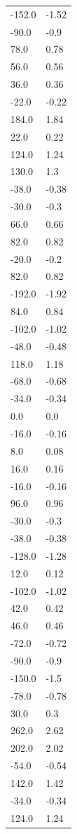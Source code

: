 \begin{longtable}{ll}
-152.0 & -1.52 \\
-90.0 & -0.9 \\
78.0 & 0.78 \\
56.0 & 0.56 \\
36.0 & 0.36 \\
-22.0 & -0.22 \\
184.0 & 1.84 \\
22.0 & 0.22 \\
124.0 & 1.24 \\
130.0 & 1.3 \\
-38.0 & -0.38 \\
-30.0 & -0.3 \\
66.0 & 0.66 \\
82.0 & 0.82 \\
-20.0 & -0.2 \\
82.0 & 0.82 \\
-192.0 & -1.92 \\
84.0 & 0.84 \\
-102.0 & -1.02 \\
-48.0 & -0.48 \\
118.0 & 1.18 \\
-68.0 & -0.68 \\
-34.0 & -0.34 \\
0.0 & 0.0 \\
-16.0 & -0.16 \\
8.0 & 0.08 \\
16.0 & 0.16 \\
-16.0 & -0.16 \\
96.0 & 0.96 \\
-30.0 & -0.3 \\
-38.0 & -0.38 \\
-128.0 & -1.28 \\
12.0 & 0.12 \\
-102.0 & -1.02 \\
42.0 & 0.42 \\
46.0 & 0.46 \\
-72.0 & -0.72 \\
-90.0 & -0.9 \\
-150.0 & -1.5 \\
-78.0 & -0.78 \\
30.0 & 0.3 \\
262.0 & 2.62 \\
202.0 & 2.02 \\
-54.0 & -0.54 \\
142.0 & 1.42 \\
-34.0 & -0.34 \\
124.0 & 1.24 \\

\end{longtable}
